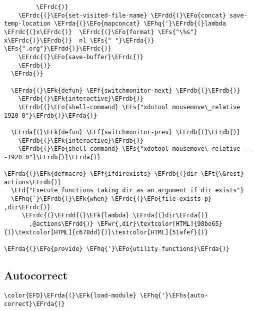 \documentclass[a4wide,10pt]{article}
\newcommand{\EFs}[1]{\textcolor{EFs}{#1}} %
\newcommand{\EFd}[1]{\textcolor{EFd}{#1}} %
\newcommand{\EFk}[1]{\textcolor{EFk}{#1}} %
\newcommand{\EFf}[1]{\textcolor{EFf}{#1}} %
\newcommand{\EFt}[1]{\textcolor{EFt}{#1}} %
\newcommand{\EFo}[1]{\textcolor{EFo}{#1}} %
\newcommand{\EFwr}[1]{\textcolor{EFwr}{#1}} %
\newcommand{\EFhq}[1]{\textcolor{EFhq}{#1}} %
\newcommand{\EFhs}[1]{\textcolor{EFhs}{#1}} %
\newcommand{\EFrda}[1]{\textcolor{EFrda}{#1}} %
\newcommand{\EFrdb}[1]{\textcolor{EFrdb}{#1}} %
\newcommand{\EFrdc}[1]{\textcolor{EFrdc}{#1}} %
\newcommand{\EFrdd}[1]{\textcolor{EFrdd}{#1}} %
\begin{document}
\begin{Code}
\begin{Verbatim}
         \EFrdc{)}
    \EFrdc{(}\EFo{set-visited-file-name} \EFrdd{(}\EFo{concat} save-temp-location \EFrda{(}\EFo{mapconcat} \EFhq{'}\EFrdb{(}lambda \EFrdc{(}x\EFrdc{)}  \EFrdc{(}\EFo{format} \EFs{"\%s"} x\EFrdc{)}\EFrdb{)}  nl \EFs{" "}\EFrda{)} \EFs{".org"}\EFrdd{)}\EFrdc{)}
    \EFrdc{(}\EFo{save-buffer}\EFrdc{)}
    \EFrdb{)}
  \EFrda{)}

  \EFrda{(}\EFk{defun} \EFf{switchmonitor-next} \EFrdb{(}\EFrdb{)}
    \EFrdb{(}\EFk{interactive}\EFrdb{)}
    \EFrdb{(}\EFo{shell-command} \EFs{"xdotool mousemove\_relative 1920 0"}\EFrdb{)}\EFrda{)}

  \EFrda{(}\EFk{defun} \EFf{switchmonitor-prev} \EFrdb{(}\EFrdb{)}
    \EFrdb{(}\EFk{interactive}\EFrdb{)}
    \EFrdb{(}\EFo{shell-command} \EFs{"xdotool mousemove\_relative -- -1920 0"}\EFrdb{)}\EFrda{)}

\EFrda{(}\EFk{defmacro} \EFf{ifdirexists} \EFrdb{(}dir \EFt{\&rest} actions\EFrdb{)}
  \EFd{"Execute functions taking dir as an argument if dir exists"}
  \EFhq{`}\EFrdb{(}\EFk{when} \EFrdc{(}\EFo{file-exists-p} ,dir\EFrdc{)}
     \EFrdc{(}\EFrdd{(}\EFk{lambda} \EFrda{(}dir\EFrda{)}
       ,@actions\EFrdd{)} \EFwr{,dir}\textcolor[HTML]{98be65}{)}\textcolor[HTML]{c678dd}{)}\textcolor[HTML]{51afef}{)}

\EFrda{(}\EFo{provide} \EFhq{'}\EFo{utility-functions}\EFrda{)}
\end{Verbatim}
\end{Code}
\subsection{Autocorrect}
\label{sec:orgef22f6f}
\begin{Code}
\begin{Verbatim}
\color{EFD}\EFrda{(}\EFk{load-module} \EFhq{'}\EFhs{auto-correct}\EFrda{)}
\end{Verbatim}
\end{Code}
\end{document}
